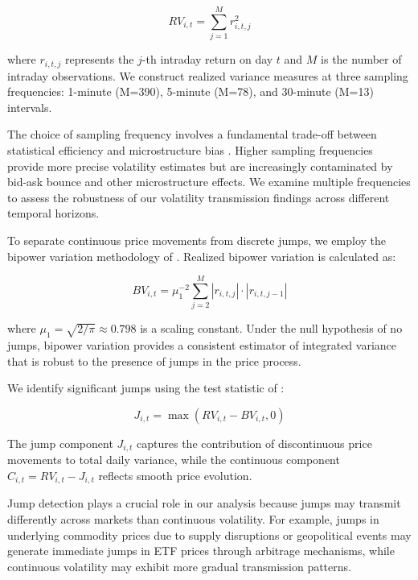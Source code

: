 \begin{equation}
RV_{i,t} = \sum_{j=1}^{M} r_{i,t,j}^2
\end{equation}

where $r_{i,t,j}$ represents the $j$-th intraday return on day $t$ and $M$ is the number of intraday observations. We construct realized variance measures at three sampling frequencies: 1-minute (M=390), 5-minute (M=78), and 30-minute (M=13) intervals.

The choice of sampling frequency involves a fundamental trade-off between statistical efficiency and microstructure bias \citep{hansen2005realized}. Higher sampling frequencies provide more precise volatility estimates but are increasingly contaminated by bid-ask bounce and other microstructure effects. We examine multiple frequencies to assess the robustness of our volatility transmission findings across different temporal horizons.

To separate continuous price movements from discrete jumps, we employ the bipower variation methodology of \citet{barndorff2004power}. Realized bipower variation is calculated as:

\begin{equation}
BV_{i,t} = \mu_1^{-2} \sum_{j=2}^{M} |r_{i,t,j}| \cdot |r_{i,t,j-1}|
\end{equation}

where $\mu_1 = \sqrt{2/\pi} \approx 0.798$ is a scaling constant. Under the null hypothesis of no jumps, bipower variation provides a consistent estimator of integrated variance that is robust to the presence of jumps in the price process.

We identify significant jumps using the test statistic of \citet{huang2005using}:

\begin{equation}
J_{i,t} = \max(RV_{i,t} - BV_{i,t}, 0)
\end{equation}

The jump component $J_{i,t}$ captures the contribution of discontinuous price movements to total daily variance, while the continuous component $C_{i,t} = RV_{i,t} - J_{i,t}$ reflects smooth price evolution.

Jump detection plays a crucial role in our analysis because jumps may transmit differently across markets than continuous volatility. For example, jumps in underlying commodity prices due to supply disruptions or geopolitical events may generate immediate jumps in ETF prices through arbitrage mechanisms, while continuous volatility may exhibit more gradual transmission patterns.

